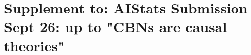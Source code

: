 \documentclass[twoside]{article}
\theoremstyle{plain}
\theoremstyle{definition}
\newcommand{\papertitle}{AIStats Submission Sept 26: up to "CBNs are causal theories"}
\begin{document}





\appendix
\newpage
\section*{Supplement to: \papertitle}


% 
% 
% 
\end{document}
